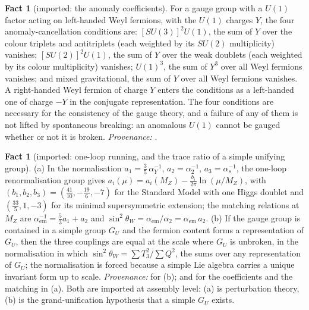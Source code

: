 \documentclass[11pt]{article}
\theoremstyle{definition}
\newtheorem{fact}[theorem]{Fact}
\begin{document}
\begin{fact}[imported: the anomaly coefficients]\label{fact:anomaly}
For a gauge group with a $U(1)$ factor acting on left-handed Weyl fermions, with the $U(1)$ charges $Y$, the four anomaly-cancellation conditions are: $[SU(3)]^{2}U(1)$, the sum of $Y$ over the colour triplets and antitriplets (each weighted by its $SU(2)$ multiplicity) vanishes; $[SU(2)]^{2}U(1)$, the sum of $Y$ over the weak doublets (each weighted by its colour multiplicity) vanishes; $U(1)^{3}$, the sum of $Y^{3}$ over all Weyl fermions vanishes; and mixed gravitational, the sum of $Y$ over all Weyl fermions vanishes. A right-handed Weyl fermion of charge $Y$ enters the conditions as a left-handed one of charge $-Y$ in the conjugate representation. The four conditions are necessary for the consistency of the gauge theory, and a failure of any of them is not lifted by spontaneous breaking: an anomalous $U(1)$ cannot be gauged whether or not it is broken. \emph{Provenance:} \cite[\S 22.4]{WeinbergQFT2}.
\end{fact}

\begin{fact}[imported: one-loop running, and the trace ratio of a simple unifying group]\label{fact:running}
(a) In the normalisation $a_{1} = \tfrac35\,\alpha_{Y}^{-1}$, $a_{2} = \alpha_{2}^{-1}$, $a_{3} = \alpha_{s}^{-1}$, the one-loop renormalisation group gives $a_{i}(\mu) = a_{i}(M_{Z}) - \tfrac{b_{i}}{2\pi}\ln(\mu/M_{Z})$, with $(b_{1}, b_{2}, b_{3}) = (\tfrac{41}{10}, -\tfrac{19}{6}, -7)$ for the Standard Model with one Higgs doublet and $(\tfrac{33}{5}, 1, -3)$ for its minimal supersymmetric extension; the matching relations at $M_{Z}$ are $\alpha_{\mathrm{em}}^{-1} = \tfrac53 a_{1} + a_{2}$ and $\sin^{2}\theta_{W} = \alpha_{\mathrm{em}}/\alpha_{2} = \alpha_{\mathrm{em}}\,a_{2}$. (b) If the gauge group is contained in a simple group $G_{U}$ and the fermion content forms a representation of $G_{U}$, then the three couplings are equal at the scale where $G_{U}$ is unbroken, in the normalisation in which $\sin^{2}\theta_{W} = \sum T_{3}^{2}/\sum Q^{2}$, the sums over any representation of $G_{U}$; the normalisation is forced because a simple Lie algebra carries a unique invariant form up to scale. \emph{Provenance:} \cite{GeorgiGlashow1974} for (b); \cite{Amaldi1991} and \cite{PDG2024} for the coefficients and the matching in (a). Both are imported at assembly level: (a) is perturbation theory, (b) is the grand-unification hypothesis that a simple $G_{U}$ exists.
\end{fact}
\end{document}
